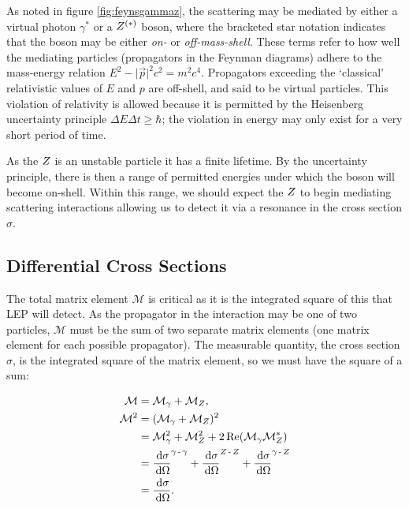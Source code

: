 \documentclass[]{article}
\begin{document}
As noted in figure \ref{fig:feynsgammaz}, the scattering may be mediated by either a virtual photon $\gamma^{*}$ or a $Z ^{(*)}$ boson, where the bracketed star notation indicates that the boson may be either \emph{on-} or \emph{off-mass-shell}. These terms refer to how well the mediating particles (propagators in the Feynman diagrams) adhere to the mass-energy relation $E^{2} - \lvert{\vec{p}}\rvert^{2}c^{2} = m^{2}c^{4}$. Propagators exceeding the `classical' relativistic values of $E$ and $p$ are off-shell, and said to be virtual particles. This violation of relativity is allowed because it is permitted by the Heisenberg uncertainty principle $\Delta E\Delta t \geq \hbar$; the violation in energy may only exist for a very short period of time.

As the $Z $ is an unstable particle it has a finite lifetime. By the uncertainty principle, there is then a range of permitted energies under which the boson will become on-shell. Within this range, we should expect the $Z $ to begin mediating scattering interactions allowing us to detect it via a resonance in the cross section $\sigma$. 

\subsection{Differential Cross Sections}

The total matrix element $\mathcal{M}$ is critical as it is the integrated square of this that LEP will detect. As the propagator in the interaction may be one of two particles, $\mathcal{M}$ must be the sum of two separate matrix elements (one matrix element for each possible propagator). The measurable quantity, the cross section $\sigma$, is the integrated square of the matrix element, so we must have the square of a sum:

\begin{align*}
\mathcal{M} &= \mathcal{M}_{\gamma} + \mathcal{M}_{\Zzero},
\\
\mathcal{M}^{2} &= (\mathcal{M}_{\gamma} + \mathcal{M}_{\Zzero})^{2}
\\
&= \mathcal{M}_{\gamma}^{2} + \mathcal{M}_{\Zzero}^{2} + 2\operatorname{Re}(\mathcal{M}_{\gamma}\mathcal{M}_{\Zzero}^{*})
\\
&= \frac{\d{\sigma}}{\d{\Omega}}^{\gamma\operatorname{-}\gamma} +
	\frac{\d{\sigma}}{\d{\Omega}}^{\Zzero\operatorname{-}\Zzero} +
	\frac{\d{\sigma}}{\d{\Omega}}^{\gamma\operatorname{-}\Zzero}
\\
&= \frac{\d{\sigma}}{\d{\Omega}}.
\end{align*}
\end{document}
